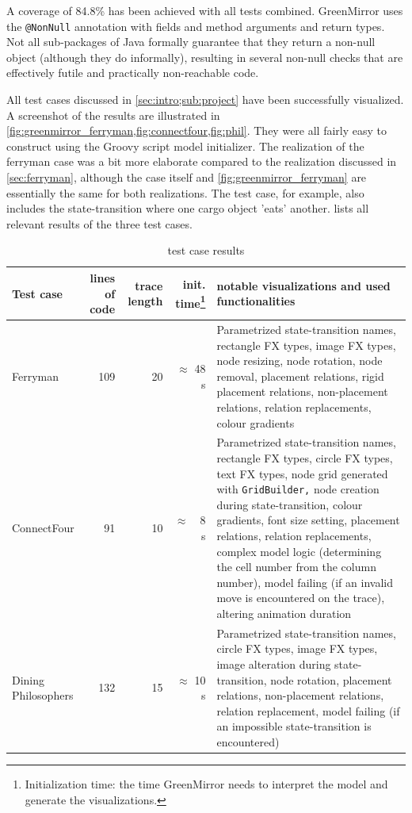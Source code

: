 \par A coverage of 84.8\% has been achieved with all tests combined. GreenMirror uses the \lstinline{@NonNull} annotation with fields and method arguments and return types. Not all sub-packages of Java formally guarantee that they return a non-null object (although they do informally), resulting in several non-null checks that are effectively futile and practically non-reachable code.
\par All test cases discussed in \cref{sec:intro;sub:project} have been successfully visualized. A screenshot of the results are illustrated in \cref{fig:greenmirror_ferryman,fig:connectfour,fig:phil}. They were all fairly easy to construct using the Groovy script model initializer. The realization of the ferryman case was a bit more elaborate compared to the realization discussed in \cref{sec:ferryman}, although the case itself and \cref{fig:greenmirror_ferryman} are essentially the same for both realizations. The test case, for example, also includes the state-transition where one cargo object 'eats' another.  lists all relevant results of the three test cases.
\newpage\begin{longtable}{|l|r|r|r|p{6.7cm}|}
\caption{test case results}\label{tab:testcases}\\
\hline \textbf{Test case} 
     & \multicolumn{1}{|p{0.9cm}|}{\textbf{lines of code}}
     & \multicolumn{1}{|p{1.0cm}|}{\textbf{trace length}} 
     & \multicolumn{1}{|p{1.2cm}|}{\textbf{init. time}\footnote{Initialization time: the time GreenMirror needs to interpret the model and generate the visualizations.}} 
     & \textbf{notable visualizations and used functionalities} \\
\hline Ferryman            & 109 & 20 & $\approx$ 48 s & Parametrized state-transition names, rectangle FX types, image FX types, node resizing, node rotation, node removal, placement relations, rigid placement relations, non-placement relations, relation replacements, colour gradients \\
\hline ConnectFour         &  91 & 10 &  $\approx$~~8 s & Parametrized state-transition names, rectangle FX types, circle FX types, text FX types, node grid generated with \texttt{GridBuilder,} node creation during state-transition, colour gradients, font size setting, placement relations, relation replacements, complex model logic (determining the cell number from the column number), model failing (if an invalid move is encountered on the trace), altering animation duration \\
\hline Dining Philosophers & 132 & 15 & $\approx$ 10 s & Parametrized state-transition names, circle FX types, image FX types, image alteration during state-transition, node rotation, placement relations, non-placement relations, relation replacement, model failing (if an impossible state-transition is encountered) \\
\hline\end{longtable}
